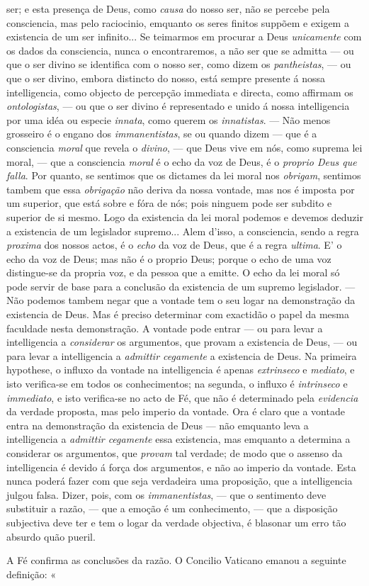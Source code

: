 ser; e esta presença de Deus, como \emph{causa} do nosso ser, não se percebe pela consciencia, mas pelo raciocinio, emquanto os seres finitos suppõem e exigem a existencia de um ser infinito... Se teimarmos em procurar a Deus \emph{unicamente} com os dados da consciencia, nunca o encontraremos, a não ser que se admitta --- ou que o ser divino se identifica com o nosso ser, como dizem os \emph{pantheistas}, --- ou que o ser divino, embora distincto do nosso, está sempre presente á nossa intelligencia, como objecto de percepção immediata e directa, como affirmam os \emph{ontologistas}, --- ou que o ser divino é representado e unido á nossa intelligencia por uma idéa ou especie \emph{innata}, como querem os \emph{innatistas}. --- Não menos grosseiro é o engano dos \emph{immanentistas}, se ou quando dizem --- que é a consciencia \emph{moral} que revela o \emph{divino}, --- que Deus vive em nós, como suprema lei moral, --- que a consciencia \emph{moral} é o echo da voz de Deus, é o \emph{proprio Deus que falla}. Por quanto, se sentimos que os dictames da lei moral nos \emph{obrigam}, sentimos tambem que essa \emph{obrigação} não deriva da nossa vontade, mas nos é imposta por um superior, que está sobre e fóra de nós; pois ninguem pode ser subdito e superior de si mesmo. Logo da existencia da lei moral podemos e devemos deduzir a existencia de um legislador supremo... Alem d'isso, a consciencia, sendo a regra \emph{proxima} dos nossos actos, é o \emph{echo} da voz de Deus, que é a regra \emph{ultima}. E' o echo da voz de Deus; mas não é o proprio Deus; porque o echo de uma voz distingue-se da propria voz, e da pessoa que a emitte. O echo da lei moral só pode servir de base para a conclusão da existencia de um supremo legislador. --- Não podemos tambem negar que a vontade tem o seu logar na demonstração da existencia de Deus. Mas é preciso determinar com exactidão o papel da mesma faculdade nesta demonstração. A vontade pode entrar --- ou para levar a intelligencia a \emph{considerar} os argumentos, que provam a existencia de Deus, --- ou para levar a intelligencia a \emph{admittir cegamente} a existencia de Deus. Na primeira hypothese, o influxo da vontade na intelligencia é apenas \emph{extrinseco} e \emph{mediato}, e isto verifica-se em todos os conhecimentos; na segunda, o influxo é \emph{intrinseco} e \emph{immediato}, e isto verifica-se no acto de Fé, que não é determinado pela \emph{evidencia} da verdade proposta, mas pelo imperio da vontade. Ora é claro que a vontade entra na demonstração da existencia de Deus --- não emquanto leva a intelligencia a \emph{admittir cegamente} essa existencia, mas emquanto a determina a considerar os argumentos, que \emph{provam} tal verdade; de modo que o assenso da intelligencia é devido á força dos argumentos, e não ao imperio da vontade. Esta nunca poderá fazer com que seja verdadeira uma proposição, que a intelligencia julgou falsa. Dizer, pois, com os \emph{immanentistas}, --- que o sentimento deve substituir a razão, --- que a emoção é um conhecimento, --- que a disposição subjectiva deve ter e tem o logar da verdade objectiva, é blasonar um erro tão absurdo quão pueril.\par A Fé confirma as conclusões da razão. O Concilio Vaticano emanou a seguinte definição: « 